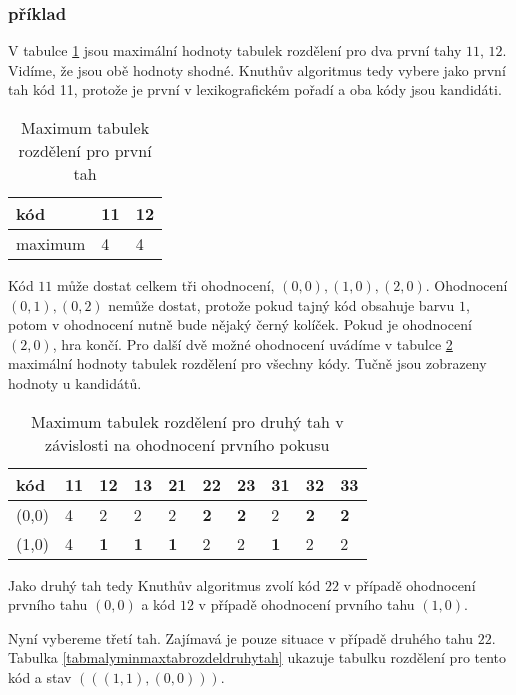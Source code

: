 \subsubsection{příklad}
\begin{prikl}\label{malyprikladminmax}
    V tabulce \ref{tabmalyminmaxprvnitah} jsou maximální hodnoty tabulek rozdělení pro dva první tahy $11$, $12$. Vidíme, že jsou obě hodnoty shodné. Knuthův algoritmus tedy vybere jako první tah kód 11, protože je první v lexikografickém pořadí a oba kódy jsou kandidáti. 


\begin{table}[h]
\centering
\begin{tabular}{l l l}
\toprule
kód & 11 & 12  \\
\midrule
maximum & 4 & 4\\
\bottomrule
\end{tabular}
\caption{Maximum tabulek rozdělení pro první tah}\label{tabmalyminmaxprvnitah}
\end{table}


Kód $11$ může dostat celkem tři ohodnocení, $(0,0), (1,0), (2,0)$. Ohodnocení $(0,1), (0,2)$ nemůže dostat, protože pokud tajný kód obsahuje barvu $1$, potom v ohodnocení nutně bude nějaký černý kolíček. Pokud je ohodnocení $(2,0)$, hra končí. Pro další dvě možné ohodnocení uvádíme v tabulce \ref{tabdruhytahmalyminmax} maximální hodnoty tabulek rozdělení pro všechny kódy. Tučně jsou zobrazeny hodnoty u kandidátů.


\begin{table}[h]
\centering
\begin{tabular}{l l l l l l l l l l}
\toprule
kód & 11 & 12 & 13 & 21 & 22 & 23 & 31 & 32 & 33\\
\midrule
(0,0) & 4& 2& 2& 2& \textbf{2}& \textbf{2}& 2& \textbf{2}& \textbf{2}\\
(1,0) & 4& \textbf{1}& \textbf{1}& \textbf{1}& 2& 2& \textbf{1}& 2& 2\\
\bottomrule
\end{tabular}
\caption{Maximum tabulek rozdělení pro druhý tah v závislosti na ohodnocení prvního pokusu}\label{tabdruhytahmalyminmax}
\end{table}


Jako druhý tah tedy Knuthův algoritmus zvolí kód $22$ v případě ohodnocení prvního tahu $(0,0)$ a kód $12$ v případě ohodnocení prvního tahu $(1,0)$. 

Nyní vybereme třetí tah. Zajímavá je pouze situace v případě druhého tahu $22$. Tabulka \ref{tabmalyminmaxtabrozdeldruhytah} ukazuje tabulku rozdělení pro tento kód a stav $(((1,1),(0,0)))$. 


\end{prikl}
